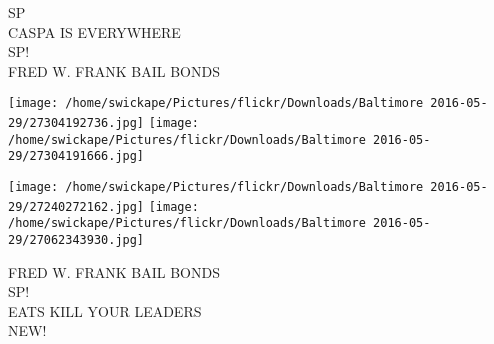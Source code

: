 \documentclass[10pt,letterpaper]{article}
\begin{document}
SP\\
CASPA IS EVERYWHERE\\
SP!\\
FRED W. FRANK BAIL BONDS\\
\pagebreak

\texttt{[image: /home/swickape/Pictures/flickr/Downloads/Baltimore 2016-05-29/27304192736.jpg]}
\texttt{[image: /home/swickape/Pictures/flickr/Downloads/Baltimore 2016-05-29/27304191666.jpg]}

\texttt{[image: /home/swickape/Pictures/flickr/Downloads/Baltimore 2016-05-29/27240272162.jpg]}
\texttt{[image: /home/swickape/Pictures/flickr/Downloads/Baltimore 2016-05-29/27062343930.jpg]}

FRED W. FRANK BAIL BONDS\\
SP!\\
EATS KILL YOUR LEADERS\\
NEW!\\
\pagebreak
\end{document}
